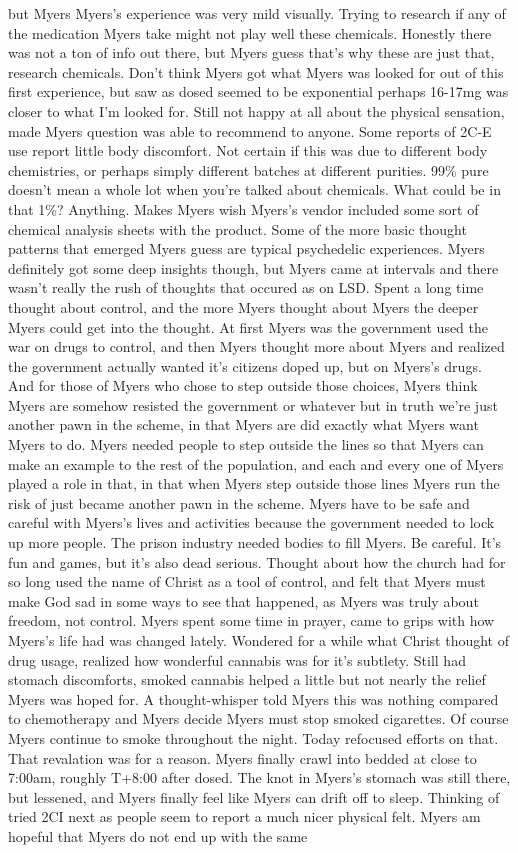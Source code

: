 \documentclass[12pt]{book}
\begin{document}
but Myers Myers's experience was very mild visually. Trying to research if any of the medication Myers take might not play well these chemicals. Honestly there was not a ton of info out there, but Myers guess that's why these are just that, research chemicals. Don't think Myers got what Myers was looked for out of this first experience, but saw as dosed seemed to be exponential perhaps 16-17mg was closer to what I'm looked for. Still not happy at all about the physical sensation, made Myers question was able to recommend to anyone. Some reports of 2C-E use report little body discomfort. Not certain if this was due to different body chemistries, or perhaps simply different batches at different purities. 99\% pure doesn't mean a whole lot when you're talked about chemicals. What could be in that 1\%? Anything. Makes Myers wish Myers's vendor included some sort of chemical analysis sheets with the product. Some of the more basic thought patterns that emerged Myers guess are typical psychedelic experiences. Myers definitely got some deep insights though, but Myers came at intervals and there wasn't really the rush of thoughts that occured as on LSD. Spent a long time thought about control, and the more Myers thought about Myers the deeper Myers could get into the thought. At first Myers was the government used the war on drugs to control, and then Myers thought more about Myers and realized the government actually wanted it's citizens doped up, but on Myers's drugs. And for those of Myers who chose to step outside those choices, Myers think Myers are somehow resisted the government or whatever but in truth we're just another pawn in the scheme, in that Myers are did exactly what Myers want Myers to do. Myers needed people to step outside the lines so that Myers can make an example to the rest of the population, and each and every one of Myers played a role in that, in that when Myers step outside those lines Myers run the risk of just became another pawn in the scheme. Myers have to be safe and careful with Myers's lives and activities because the government needed to lock up more people. The prison industry needed bodies to fill Myers. Be careful. It's fun and games, but it's also dead serious. Thought about how the church had for so long used the name of Christ as a tool of control, and felt that Myers must make God sad in some ways to see that happened, as Myers was truly about freedom, not control. Myers spent some time in prayer, came to grips with how Myers's life had was changed lately. Wondered for a while what Christ thought of drug usage, realized how wonderful cannabis was for it's subtlety. Still had stomach discomforts, smoked cannabis helped a little but not nearly the relief Myers was hoped for. A thought-whisper told Myers this was nothing compared to chemotherapy and Myers decide Myers must stop smoked cigarettes. Of course Myers continue to smoke throughout the night. Today refocused efforts on that. That revalation was for a reason. Myers finally crawl into bedded at close to 7:00am, roughly T+8:00 after dosed. The knot in Myers's stomach was still there, but lessened, and Myers finally feel like Myers can drift off to sleep. Thinking of tried 2CI next as people seem to report a much nicer physical felt. Myers am hopeful that Myers do not end up with the same 
\end{document}
